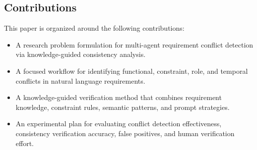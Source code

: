 \subsection{Contributions}
This paper is organized around the following contributions:
\begin{itemize}[leftmargin=*]
  \item A research problem formulation for multi-agent requirement conflict detection
  via knowledge-guided consistency analysis.
  \item A focused workflow for identifying functional, constraint, role, and temporal
  conflicts in natural language requirements.
  \item A knowledge-guided verification method that combines requirement knowledge,
  constraint rules, semantic patterns, and prompt strategies.
  \item An experimental plan for evaluating conflict detection effectiveness,
  consistency verification accuracy, false positives, and human verification effort.
\end{itemize}
